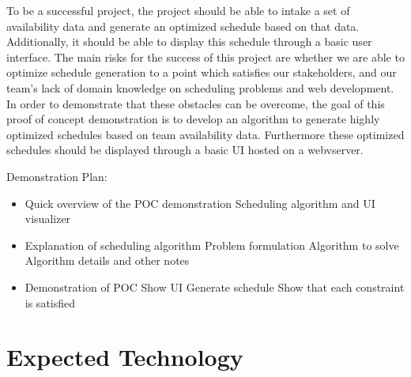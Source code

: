\documentclass{article}
\begin{document}
To be a successful project, the project should be able to intake a set of 
availability data and generate an optimized schedule based on that data. 
Additionally, it should be able to display this schedule through a basic
user interface. The main risks for the success of this project are whether 
we are able to optimize schedule generation to a point which satisfies our 
stakeholders, and our team's lack of domain knowledge on scheduling problems 
and web development. \\

In order to demonstrate that these obstacles can be 
overcome, the goal of this proof of concept demonstration is to develop
an algorithm to generate highly optimized schedules based on team availability 
data. Furthermore these optimized schedules should be displayed through a 
basic UI hosted on a webvserver.

Demonstration Plan:
\begin{itemize}
  \item Quick overview of the POC demonstration
    \subitem Scheduling algorithm and UI visualizer
  \item Explanation of scheduling algorithm
    \subitem Problem formulation
    \subitem Algorithm to solve
    \subitem Algorithm details and other notes
  \item Demonstration of POC
    \subitem Show UI
    \subitem Generate schedule
    \subitem Show that each constraint is satisfied
\end{itemize}

\section{Expected Technology}
\end{document}
